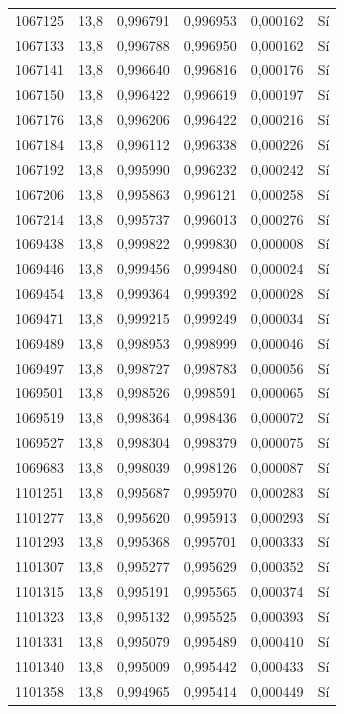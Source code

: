 \begin{longtable}{lccccc}
1067125 & 13,8 & 0,996791 & 0,996953 & 0,000162 & Sí \\
1067133 & 13,8 & 0,996788 & 0,996950 & 0,000162 & Sí \\
1067141 & 13,8 & 0,996640 & 0,996816 & 0,000176 & Sí \\
1067150 & 13,8 & 0,996422 & 0,996619 & 0,000197 & Sí \\
1067176 & 13,8 & 0,996206 & 0,996422 & 0,000216 & Sí \\
1067184 & 13,8 & 0,996112 & 0,996338 & 0,000226 & Sí \\
1067192 & 13,8 & 0,995990 & 0,996232 & 0,000242 & Sí \\
1067206 & 13,8 & 0,995863 & 0,996121 & 0,000258 & Sí \\
1067214 & 13,8 & 0,995737 & 0,996013 & 0,000276 & Sí \\
1069438 & 13,8 & 0,999822 & 0,999830 & 0,000008 & Sí \\
1069446 & 13,8 & 0,999456 & 0,999480 & 0,000024 & Sí \\
1069454 & 13,8 & 0,999364 & 0,999392 & 0,000028 & Sí \\
1069471 & 13,8 & 0,999215 & 0,999249 & 0,000034 & Sí \\
1069489 & 13,8 & 0,998953 & 0,998999 & 0,000046 & Sí \\
1069497 & 13,8 & 0,998727 & 0,998783 & 0,000056 & Sí \\
1069501 & 13,8 & 0,998526 & 0,998591 & 0,000065 & Sí \\
1069519 & 13,8 & 0,998364 & 0,998436 & 0,000072 & Sí \\
1069527 & 13,8 & 0,998304 & 0,998379 & 0,000075 & Sí \\
1069683 & 13,8 & 0,998039 & 0,998126 & 0,000087 & Sí \\
1101251 & 13,8 & 0,995687 & 0,995970 & 0,000283 & Sí \\
1101277 & 13,8 & 0,995620 & 0,995913 & 0,000293 & Sí \\
1101293 & 13,8 & 0,995368 & 0,995701 & 0,000333 & Sí \\
1101307 & 13,8 & 0,995277 & 0,995629 & 0,000352 & Sí \\
1101315 & 13,8 & 0,995191 & 0,995565 & 0,000374 & Sí \\
1101323 & 13,8 & 0,995132 & 0,995525 & 0,000393 & Sí \\
1101331 & 13,8 & 0,995079 & 0,995489 & 0,000410 & Sí \\
1101340 & 13,8 & 0,995009 & 0,995442 & 0,000433 & Sí \\
1101358 & 13,8 & 0,994965 & 0,995414 & 0,000449 & Sí \\

\end{longtable}
